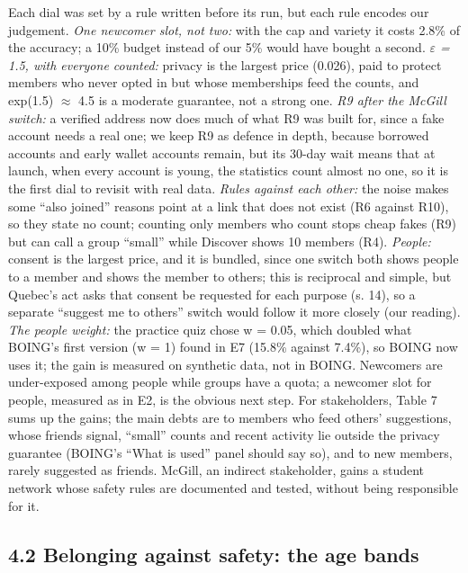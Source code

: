 \documentclass[11pt,letterpaper]{article}
\begin{document}
Each dial was set by a rule written before its run, but each rule encodes our judgement. \textit{One newcomer
slot, not two:} with the cap and variety it costs 2.8\% of the accuracy; a 10\% budget instead of our 5\%
would have bought a second. \textit{$\varepsilon$ = 1.5, with everyone counted:} privacy is the largest price
(0.026), paid to protect members who never opted in but whose memberships feed the counts, and exp(1.5)
$\approx$ 4.5 is a moderate guarantee, not a strong one. \textit{R9 after the McGill switch:} a verified
address now does much of what R9 was built for, since a fake account needs a real one; we keep R9 as defence
in depth, because borrowed accounts and early wallet accounts remain, but its 30-day wait means that at
launch, when every account is young, the statistics count almost no one, so it is the first dial to revisit
with real data. \textit{Rules against each other:} the noise makes some ``also joined'' reasons point at a
link that does not exist (R6 against R10), so they state no count; counting only members who count stops cheap
fakes (R9) but can call a group ``small'' while Discover shows 10 members (R4). \textit{People:} consent is
the largest price, and it is bundled, since one switch both shows people to a member and shows the member to
others; this is reciprocal and simple, but Quebec's act asks that consent be requested for each purpose (s.
14), so a separate ``suggest me to others'' switch would follow it more closely (our reading). \textit{The
people weight:} the practice quiz chose w = 0.05, which doubled what BOING's first version (w = 1) found in E7
(15.8\% against 7.4\%), so BOING now uses it; the gain is measured on synthetic data, not in BOING. Newcomers
are under-exposed among people while groups have a quota; a newcomer slot for people, measured as in E2, is
the obvious next step. For stakeholders, Table 7 sums up the gains; the main debts are to members who feed
others' suggestions, whose friends signal, ``small'' counts and recent activity lie outside the privacy
guarantee (BOING's ``What is used'' panel should say so), and to new members, rarely suggested as friends.
McGill, an indirect stakeholder, gains a student network whose safety rules are documented and tested, without
being responsible for it.

\subsection{4.2 Belonging against safety: the age bands}
\end{document}
